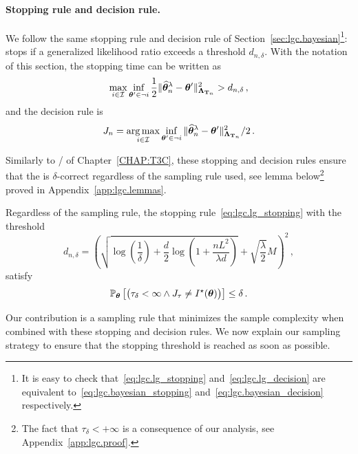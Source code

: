 \paragraph{Stopping rule and decision rule.}
We follow the same stopping rule and decision rule of Section~\ref{sec:lgc.bayesian}\footnote{It is easy to check that~\eqref{eq:lgc.lg_stopping} and~\eqref{eq:lgc.lg_decision} are equivalent to~\eqref{eq:lgc.bayesian_stopping} and~\eqref{eq:lgc.bayesian_decision} respectively.}: \LG{} stops if a generalized likelihood ratio exceeds a threshold $d_{n,\delta}$. With the notation of this section, the stopping time can be written as
\begin{align}\label{eq:lgc.lg_stopping}
    \max_{i\in \mathcal{I}} \inf_{{\boldsymbol \theta}' \in \neg i}\frac{1}{2}\Vert \widehat{{\boldsymbol \theta}}_n^\lambda - {\boldsymbol \theta}' \Vert^2_{{\boldsymbol \Lambda}_{{\bf T}_n}} > d_{n,\delta}\,,
\end{align}
and the decision rule is 
\begin{align}\label{eq:lgc.lg_decision}
    J_n = \operatorname*{arg\,max}_{i\in \mathcal{I}} \inf_{{\boldsymbol \theta}' \in \neg i}\Vert \widehat{{\boldsymbol \theta}}_n^\lambda - {\boldsymbol \theta}' \Vert^2_{{\boldsymbol \Lambda}_{{\bf T}_n}}/2\,.
\end{align}

Similarly to \TCC{}/\TTTS{} of Chapter~\ref{CHAP:T3C}, these stopping and decision rules ensure that the \LG{} is $\delta$-correct regardless of the sampling rule used, see lemma below\footnote{The fact that $\tau_\delta <+\infty$ is a consequence of our analysis, see Appendix~\ref{app:lgc.proof}.} proved in Appendix~\ref{app:lgc.lemmas}.

\begin{lemma}\label{lemma:lgc.pac}
\begin{leftbar}[lemmabar]
Regardless of the sampling rule, the stopping rule~\eqref{eq:lgc.lg_stopping} with the threshold
\begin{equation} \label{eq:def_beta}
    d_{n,\delta} =\left( \sqrt{\log\left( \frac{1}{\delta}\right)+\frac{d}{2}\log\left(1+\frac{n L^2}{\lambda d} \right)} +\sqrt{\frac{\lambda}{2}}M\right)^2\,,
\end{equation}
satisfy
\[
    \mathbb{P}_{\boldsymbol \theta}\left[\big(\tau_{\delta} < \infty \wedge J_\tau \neq I^\star({\boldsymbol \theta})\big)\right] \leq \delta\,.
\]
\end{leftbar}
\end{lemma}
Our contribution is a sampling rule that minimizes the sample complexity when combined with these stopping and decision rules.
We now explain our sampling strategy to ensure that the stopping threshold is reached as soon as possible.

